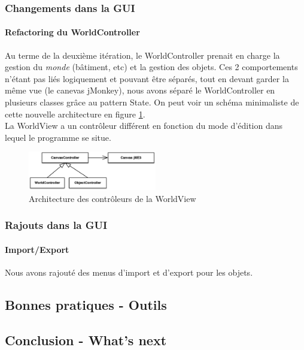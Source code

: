 	\subsubsection{Changements dans la GUI}

		\paragraph{Refactoring du WorldController}
		Au terme de la deuxième itération, le WorldController prenait en charge 
		la gestion du \textit{monde} (bâtiment, etc) et la gestion des objets.
		Ces 2 comportements n'étant pas liés logiquement et pouvant être séparés,
		tout en devant garder la même vue (le canevas jMonkey), nous avons séparé
		le WorldController en plusieurs classes grâce au pattern State.
		On peut voir un schéma minimaliste de cette nouvelle architecture en 
		figure \ref{fig:gui:newworldcontroller}.\\

		La WorldView a un contrôleur différent en fonction du mode d'édition
		dans lequel le programme se situe. 
		\begin{figure}
			\center
			\includegraphics[width=0.5\textwidth]{iteration3/fig/WorldState.eps}
			\caption{\label{fig:gui:newworldcontroller} Architecture des contrôleurs de la WorldView}
		\end{figure}

	\subsubsection{Rajouts dans la GUI}

		\paragraph{Import/Export}
		Nous avons rajouté des menus d'import et d'export pour les objets.


\subsection{Bonnes pratiques - Outils}


\subsection{Conclusion - What's next}

